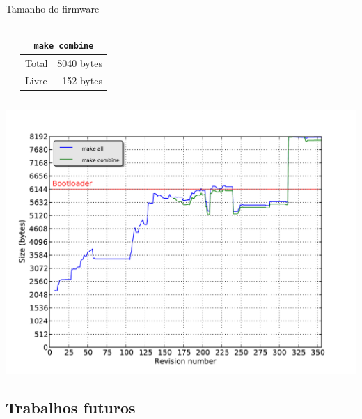 \documentclass{beamer}
\begin{document}
\begin{frame}[shrink=10]{Tamanho do firmware}
\begin{columns}
\begin{center}
\begin{tabular}{lr}
				\bottomrule
			\end{tabular}
		\end{center}

		\begin{center}
			\begin{tabular}{lr}
				\toprule

				\multicolumn{2}{c}{\texttt{make combine}} \\

				\midrule

				Total                & 8040 bytes \\
				Livre                &  152 bytes \\

				\bottomrule
			\end{tabular}
		\end{center}
	\end{columns}
\end{frame}

\begin{frame}[plain]{}
	\begin{center}
		\includegraphics[keepaspectratio, width=1.0\textwidth, height=1.0\textheight, clip, trim=0.20in 0.20in 0.20in 0.20in]{img/firmware_size_graph.pdf}
	\end{center}
\end{frame}


\subsection{Trabalhos futuros}
\end{document}

